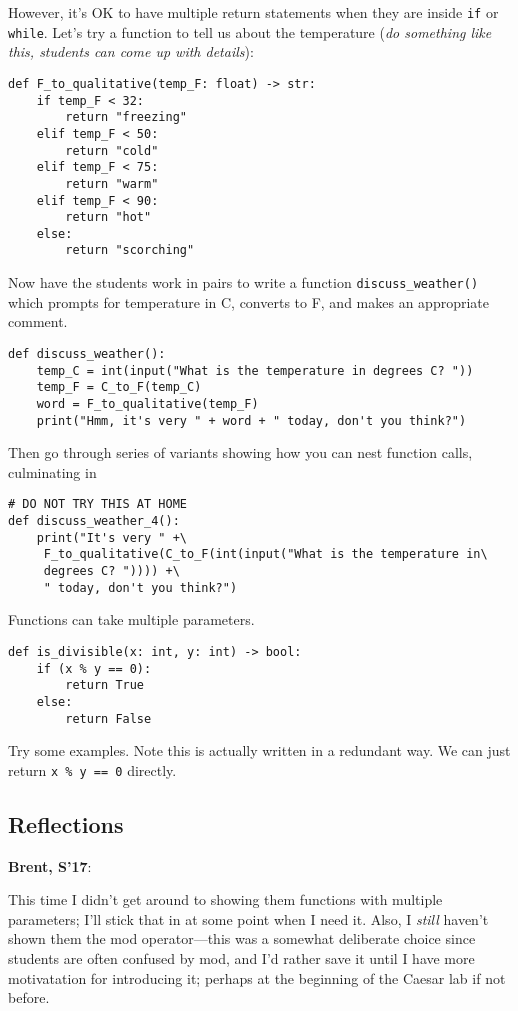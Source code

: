\documentclass{article}
\newenvironment{reflect}[1]
{
  \noindent
  \begin{lrbox}{\reflectbox}
    \begin{minipage}[t]{\textwidth}
      \textbf{#1}:
}{
    \end{minipage}
  \end{lrbox}
  \fbox{\usebox{\reflectbox}}
}
\begin{document}
However, it's OK to have multiple return statements when they are
inside \verb|if| or \verb|while|.  Let's try a function to tell us
about the temperature (\emph{do something like this, students can come
  up with details}):
\begin{verbatim}
def F_to_qualitative(temp_F: float) -> str:
    if temp_F < 32:
        return "freezing"
    elif temp_F < 50:
        return "cold"
    elif temp_F < 75:
        return "warm"
    elif temp_F < 90:
        return "hot"
    else:
        return "scorching"
\end{verbatim}

Now have the students work in pairs to write a function
\verb|discuss_weather()| which prompts for temperature in C, converts
to F, and makes an appropriate comment.

\begin{verbatim}
def discuss_weather():
    temp_C = int(input("What is the temperature in degrees C? "))
    temp_F = C_to_F(temp_C)
    word = F_to_qualitative(temp_F)
    print("Hmm, it's very " + word + " today, don't you think?")
\end{verbatim}

Then go through series of variants showing how you can nest function
calls, culminating in

\begin{verbatim}
# DO NOT TRY THIS AT HOME
def discuss_weather_4():
    print("It's very " +\
     F_to_qualitative(C_to_F(int(input("What is the temperature in\
     degrees C? ")))) +\
     " today, don't you think?")
\end{verbatim}

Functions can take multiple parameters.

\begin{verbatim}
def is_divisible(x: int, y: int) -> bool:
    if (x % y == 0):
        return True
    else:
        return False
\end{verbatim}

Try some examples.  Note this is actually written in a redundant way.  We
can just return \verb|x % y == 0| directly.

\subsection*{Reflections}

\begin{reflect}{Brent, S'17}
  This time I didn't get around to showing them functions with
  multiple parameters; I'll stick that in at some point when I need
  it. Also, I \emph{still} haven't shown them the mod operator---this
  was a somewhat deliberate choice since students are often confused
  by mod, and I'd rather save it until I have more motivatation for
  introducing it; perhaps at the beginning of the Caesar lab if not
  before.
\end{reflect}
\end{document}
